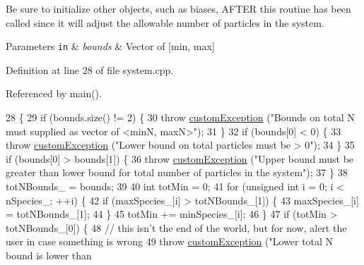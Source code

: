 Be sure to initialize other objects, such as biases, A\+F\+T\+E\+R this routine has been called since it will adjust the allowable number of particles in the system.


\begin{DoxyParams}[1]{Parameters}
\mbox{\tt in}  & {\em bounds} & Vector of \mbox{[}min, max\mbox{]} \\
\hline
\end{DoxyParams}


Definition at line 28 of file system.\+cpp.



Referenced by main().


\begin{DoxyCode}
28                                                               \{
29                 \textcolor{keywordflow}{if} (bounds.size() != 2) \{
30                                 \textcolor{keywordflow}{throw} \hyperlink{classcustom_exception}{customException} (\textcolor{stringliteral}{"Bounds on total N must supplied as
       vector of <minN, maxN>"});
31                 \}
32                 \textcolor{keywordflow}{if} (bounds[0] < 0) \{
33                                 \textcolor{keywordflow}{throw} \hyperlink{classcustom_exception}{customException} (\textcolor{stringliteral}{"Lower bound on total particles must
       be > 0"});
34                 \}
35                 \textcolor{keywordflow}{if} (bounds[0] > bounds[1]) \{
36                                 \textcolor{keywordflow}{throw} \hyperlink{classcustom_exception}{customException} (\textcolor{stringliteral}{"Upper bound must be greater than
       lower bound for total number of particles in the system"});
37                 \}
38                 totNBounds\_ = bounds;
39 
40                 \textcolor{keywordtype}{int} totMin = 0;
41                 \textcolor{keywordflow}{for} (\textcolor{keywordtype}{unsigned} \textcolor{keywordtype}{int} i = 0; i < nSpecies\_; ++i) \{
42                                 \textcolor{keywordflow}{if} (maxSpecies\_[i] > totNBounds\_[1]) \{
43                                                 maxSpecies\_[i] = totNBounds\_[1];
44                                 \}
45                                 totMin += minSpecies\_[i];
46                 \}
47                 \textcolor{keywordflow}{if} (totMin > totNBounds\_[0]) \{
48                                 \textcolor{comment}{// this isn't the end of the world, but for now, alert the user in case
       something is wrong}
49                                 \textcolor{keywordflow}{throw} \hyperlink{classcustom_exception}{customException} (\textcolor{stringliteral}{"Lower total N bound is lower than
}
\end{DoxyCode}
